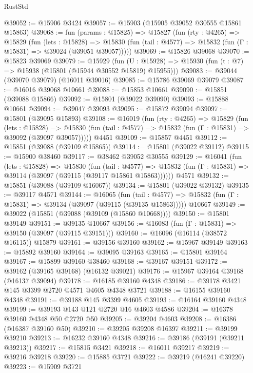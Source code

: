 \begin{lexlean}{RustStd}
\begin{coremodule}
@39052 := @15906 @3424
@39057 := @15903 (@15905 @39052 @30555 @15861 @15863)
@39068 := fun (params : @15825) =>
  @15827
    (fun (rty : @4265) =>
    @15829
      (fun (lets : @15828) =>
      @15830 (fun (tail : @4577) => @15832 (fun (Γ : @15831) => @39024 (@39051 @39057)))))
@39069 := @15826 @39068
@39070 := @15823 @39069
@39079 := @15929
    (fun (U : @15928) => @15930 (fun (t : @7) => @15938 (@15801 (@15944 @30552 @15819) @15955)))
@39083 := @39044 (@39070 @39079) (@16011 @39016)
@39085 := @15786 @39069 @39079
@39087 := @16016 @39068 @10661
@39088 := @15853 @10661
@39090 := @15851 (@39088 @15866)
@39092 := @15801 (@39022 @39090)
@39093 := @15888 @10661
@39094 := @39047 @39093
@39095 := @15872 @39094
@39097 := @15801 (@39095 @15893)
@39108 := @16019
    (fun (rty : @4265) =>
    @15829
      (fun (lets : @15828) =>
      @15830 (fun (tail : @4577) => @15832 (fun (Γ : @15831) => @39092 (@39097 @39057)))))
    @4451
@39109 := @15857 @4451
@39112 := @15851 (@39088 (@39109 @15865))
@39114 := @15801 (@39022 @39112)
@39115 := @15900 @38460
@39117 := @38462 @39052 @30555
@39129 := @16041
    (fun (lets : @15828) =>
    @15830
      (fun (tail : @4577) =>
      @15832 (fun (Γ : @15831) => @39114 (@39097 (@39115 (@39117 @15861 @15863))))))
    @4571
@39132 := @15851 (@39088 (@39109 @16067))
@39134 := @15801 (@39022 @39132)
@39135 := @39117 @4571
@39144 := @16065
    (fun (tail : @4577) => @15832 (fun (Γ : @15831) => @39134 (@39097 (@39115 (@39135 @15863)))))
    @10667
@39149 := @39022 (@15851 (@39088 (@39109 (@15860 @10668))))
@39150 := @15801 @39149
@39151 := @39135 @10667
@39156 := @16083 (fun (Γ : @15831) => @39150 (@39097 (@39115 @39151)))
@39160 := @16096 (@16114 (@38572 @16115)) @15879
@39161 := @39156 @39160
@39162 := @15967 @39149
@39163 := @15892 @39160
@39164 := @39095 @39163
@39165 := @15801 @39164
@39167 := @15899 @39160 @38460
@39168 := @39167 @39151
@39172 := @39162 (@39165 @39168) (@16132 @39021)
@39176 := @15967 @39164 @39168 (@16137 @39094)
@39178 := @16185 @39160 @4348
@39186 := @39178 @3421 @145 @3399 @2720 @4571 @4605 @4348 @3721
@39188 := @16155 @39160 @4348
@39191 := @39188 @145 @3399 @4605
@39193 := @16164 @39160 @4348
@39199 := @39193 @143 @121 @2720 @16 @4603 @4586
@39204 := @16378 @39160 @4348 @50 @2720 @50
@39205 := @39204 @4603
@39208 := @16386 (@16387 @39160 @50)
@39210 := @39205 @39208 @16397
@39211 := @39199 @39210
@39213 := @16232 @39160 @4348
@39216 := @39186 (@39191 (@39211 @39213))
@39217 := @15815 @3421
@39218 := @16011 @39217
@39219 := @39216 @39218
@39220 := @15885 @3721
@39222 := @39219 (@16241 @39220)
@39223 := @15909 @3721

\end{coremodule}
\end{lexlean}

